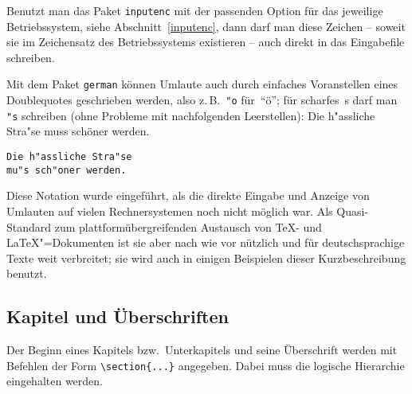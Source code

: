 Benutzt man das Paket \texttt{inputenc} mit der passenden Option
für das jeweilige Betriebssystem, siehe Abschnitt~\ref{inputenc},
dann darf man diese Zeichen -- soweit sie im Zeichensatz des Betriebssystems
existieren -- auch direkt in das Eingabefile schreiben.

Mit dem Paket \texttt{german} %
können
Umlaute auch durch einfaches Voranstellen eines Doublequotes geschrieben werden, 
also z.\,B.\ \verb|"o| für~"`ö"';
für scharfes~s darf man \verb|"s| schreiben (ohne Probleme mit
nachfolgenden Leerstellen):
\exa
Die h"assliche Stra"se
muss schöner werden.
\exb
\begin{verbatim}
Die h"assliche Stra"se
mu"s sch"oner werden.
\end{verbatim}
\exc
Diese Notation wurde eingeführt, als die direkte Eingabe und
Anzeige von Umlauten auf vielen Rechnersystemen noch nicht möglich war.
Als Quasi-Standard zum plattformübergreifenden Austausch von 
\TeX- und \LaTeX"=Dokumenten ist sie aber nach wie vor nützlich und
für deutschsprachige Texte weit verbreitet; sie wird auch in einigen 
Beispielen dieser Kurzbeschreibung benutzt.
 


\subsection{Kapitel und Überschriften}
 
Der Beginn eines Kapitels bzw.\ Unterkapitels und seine
Überschrift werden mit Befehlen der Form \verb|\section{...}|
angegeben. Dabei muss die logische Hierarchie eingehalten werden.

